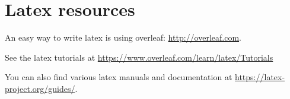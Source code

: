 \section{Latex resources}


An easy way to write latex is using overleaf:  \url{http://overleaf.com}.

See the latex tutorials at \url{https://www.overleaf.com/learn/latex/Tutorials}

You can also find various latex manuals and documentation at
\url{https://latex-project.org/guides/}.